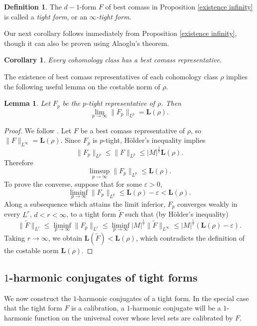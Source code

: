 \documentclass[reqno,11pt]{amsart}
\newcommand{\Comass}{\mathbf L}
\newcommand{\dfn}[1]{\emph{#1}\index{#1}}
\newtheorem{lemma}[theorem]{Lemma}
\newtheorem{corollary}[theorem]{Corollary}
\theoremstyle{definition}
\newtheorem{definition}[theorem]{Definition}
\numberwithin{equation}{section}
\begin{document}
\begin{definition}
The $d - 1$-form $F$ of best comass in Proposition \ref{existence infinity} is called a \dfn{tight form}, or an \dfn{$\infty$-tight form}.
\end{definition}

Our next corollary follows immediately from Proposition \ref{existence infinity}, though it can also be proven using Alaoglu's theorem.

\begin{corollary}
Every cohomology class has a best comass representative.
\end{corollary}

The existence of best comass representatives of each cohomology class $\rho$ implies the following useful lemma on the costable norm of $\rho$.

\begin{lemma}\label{p tights approximate L}
Let $F_p$ be the $p$-tight representative of $\rho$. Then 
$$\lim_{p \to \infty} \|F_p\|_{L^p} = \Comass(\rho).$$
\end{lemma}
\begin{proof}
We follow \cite[Lemma 2.7]{daskalopoulos2020transverse}.
Let $F$ be a best comass representative of $\rho$, so $\|F\|_{L^\infty} = \Comass(\rho)$.
Since $F_p$ is $p$-tight, H\"older's inequality implies 
$$\|F_p\|_{L^p} \leq \|F\|_{L^p} \leq |M|^{\frac{1}{p}} \Comass(\rho).$$
Therefore 
$$\limsup_{p \to \infty} \|F_p\|_{L^p} \leq \Comass(\rho).$$
To prove the converse, suppose that for some $\varepsilon > 0$,
$$\liminf_{p \to \infty} \|F_p\|_{L^p} \leq \Comass(\rho) - \varepsilon < \Comass(\rho).$$
Along a subsequence which attains the limit inferior, $F_p$ converges weakly in every $L^r$, $d < r < \infty$, to a tight form $\tilde F$ such that (by H\"older's inequality)
$$\|\tilde F\|_{L^r} \leq \liminf_{p \to \infty} \|F_p\|_{L^r} \leq \liminf_{p \to \infty} |M|^{\frac{1}{r}} \|\tilde F\|_{L^\infty} \leq |M|^{\frac{1}{r}} (\Comass(\rho) - \varepsilon).$$
Taking $r \to \infty$, we obtain $\Comass(\tilde F) < \Comass(\rho)$, which contradicts the definition of the costable norm $\Comass(\rho)$.
\end{proof}


\subsection{\texorpdfstring{$1$-harmonic conjugates of tight forms}{One-harmonic conjugates of tight forms}}
We now construct the $1$-harmonic conjugates of a tight form.
In the special case that the tight form $F$ is a calibration, a $1$-harmonic conjugate will be a $1$-harmonic function on the universal cover whose level sets are calibrated by $F$.
\end{document}
